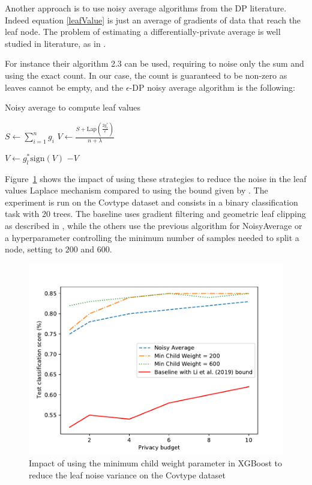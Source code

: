 \documentclass{article}
\theoremstyle{definition}
\begin{document}
Another approach is to use noisy average algorithms from the DP literature. Indeed equation \ref{leafValue} is just an average of gradients of data that reach the leaf node.
The problem of estimating a differentially-private average is well studied in literature, as in \cite{li2016dp}.

For instance their algorithm 2.3 can be used, requiring to noise only the sum and using the exact count.
In our case, the count is guaranteed to be non-zero as leaves cannot be empty, and the $\epsilon$-DP noisy average algorithm is the following:
\begin{algorithm}
\caption{Noisy average to compute leaf values}
$S \gets \sum_{i=1}^{n} g_i$ \; 
$V \gets \frac{ S + \text{Lap}( \frac{2g_l^*}{\epsilon} )}{n + \lambda} $ \; 

{
    $V \gets g_l^* \text{sign}(V)$ \;
}
\Return $-V$
\end{algorithm}

Figure~\ref{leafNoisePlot} shows the impact of using these strategies to reduce the noise in the leaf values Laplace mechanism 
compared to using the bound given by \cite{li2020privacy}. The experiment is run on the Covtype dataset and consists in a binary
classification task with 20 trees. The baseline uses gradient filtering and geometric leaf clipping as described in \cite{li2020privacy},
while the others use the previous algorithm for NoisyAverage or a hyperparameter controlling the 
minimum number of samples needed to split a node, setting to $200$ and $600$.

\begin{figure}[h]
\centering 
\includegraphics[scale=0.7]{figs/plot_leafnoise.pdf}
\caption{Impact of using the minimum child weight parameter in XGBoost to reduce the leaf noise variance on the Covtype dataset}
\label{leafNoisePlot}
\end{figure}
\end{document}
